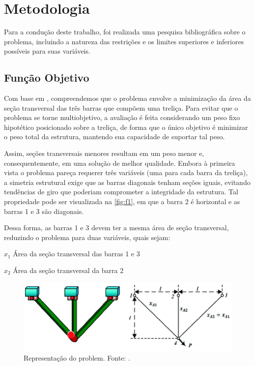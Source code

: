 \section{Metodologia}%
\label{sec:metodologia}

Para a condução deste trabalho, foi realizada uma pesquisa bibliográfica sobre o problema, incluindo a natureza das restrições e os limites superiores e inferiores possíveis para suas variáveis.

\subsection{Função Objetivo}

Com base em , compreendemos que o problema envolve a minimização da área da seção transversal das três barras que compõem uma treliça. Para evitar que o problema se torne multiobjetivo, a avaliação é feita considerando um peso fixo hipotético posicionado sobre a treliça, de forma que o único objetivo é minimizar o peso total da estrutura, mantendo sua capacidade de suportar tal peso.

Assim, seções transversais menores resultam em um peso menor e, consequentemente, em uma solução de melhor qualidade. Embora à primeira vista o problema pareça requerer três variáveis (uma para cada barra da treliça), a simetria estrutural exige que as barras diagonais tenham seções iguais, evitando tendências de giro que poderiam comprometer a integridade da estrutura.
Tal propriedade pode ser visualizada na \autoref{fig:f1}, em que a barra 2 é horizontal e as barras 1 e 3 são diagonais.

Dessa forma, as barras 1 e 3 devem ter a mesma área de seção transversal, reduzindo o problema para duas variáveis, quais sejam:
\begin{symbols}
    \item[\(x_1\) Área da seção transversal das barras 1 e 3]
    \item[\(x_2\) Área da seção transversal da barra 2]
\end{symbols}

\begin{figure}[!ht]%
    \centering
    \includegraphics[scale=1]{images/Three-Bar-Truss-Design.png}
    \caption{Representação do \gls{problem}. Fonte: .}%
    \label{fig:f1}
\end{figure}

